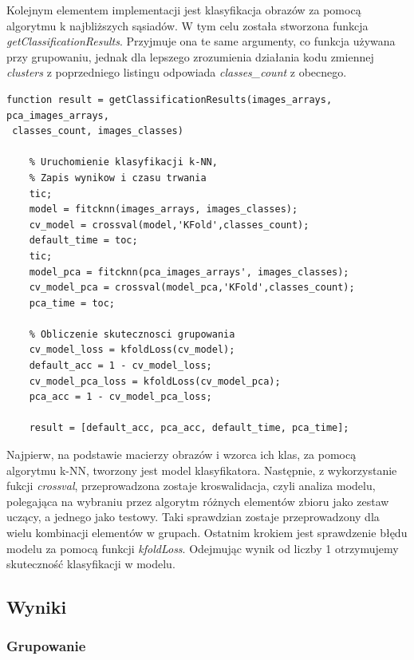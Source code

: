 Kolejnym elementem implementacji jest klasyfikacja obrazów za pomocą algorytmu k najbliższych sąsiadów. W tym celu została stworzona funkcja \textit{getClassificationResults}. Przyjmuje ona te same argumenty, co funkcja używana przy grupowaniu, jednak dla lepszego zrozumienia działania kodu zmiennej \textit{clusters} z poprzedniego listingu odpowiada \textit{classes\_count} z obecnego.

\vspace{5mm} 

\begin{lstlisting}[linewidth=16.0cm]
function result = getClassificationResults(images_arrays, pca_images_arrays,
 classes_count, images_classes)

	% Uruchomienie klasyfikacji k-NN,
	% Zapis wynikow i czasu trwania
	tic;
	model = fitcknn(images_arrays, images_classes);
	cv_model = crossval(model,'KFold',classes_count);
	default_time = toc;
	tic;
	model_pca = fitcknn(pca_images_arrays', images_classes);
	cv_model_pca = crossval(model_pca,'KFold',classes_count);
	pca_time = toc;
	
	% Obliczenie skutecznosci grupowania
	cv_model_loss = kfoldLoss(cv_model);
	default_acc = 1 - cv_model_loss;
	cv_model_pca_loss = kfoldLoss(cv_model_pca);
	pca_acc = 1 - cv_model_pca_loss;
	
	result = [default_acc, pca_acc, default_time, pca_time];
\end{lstlisting}

\vspace{5mm} 

Najpierw, na podstawie macierzy obrazów i wzorca ich klas, za pomocą algorytmu k-NN, tworzony jest model klasyfikatora. Następnie, z wykorzystanie fukcji \textit{crossval}, przeprowadzona zostaje kroswalidacja, czyli analiza modelu, polegająca na wybraniu przez algorytm różnych elementów zbioru jako zestaw uczący, a jednego jako testowy. Taki sprawdzian zostaje przeprowadzony dla wielu kombinacji elementów w grupach. Ostatnim krokiem jest sprawdzenie błędu modelu za pomocą funkcji \textit{kfoldLoss}. Odejmując wynik od liczby 1 otrzymujemy skuteczność klasyfikacji w modelu. 


\subsection{Wyniki}

\subsubsection{Grupowanie}


